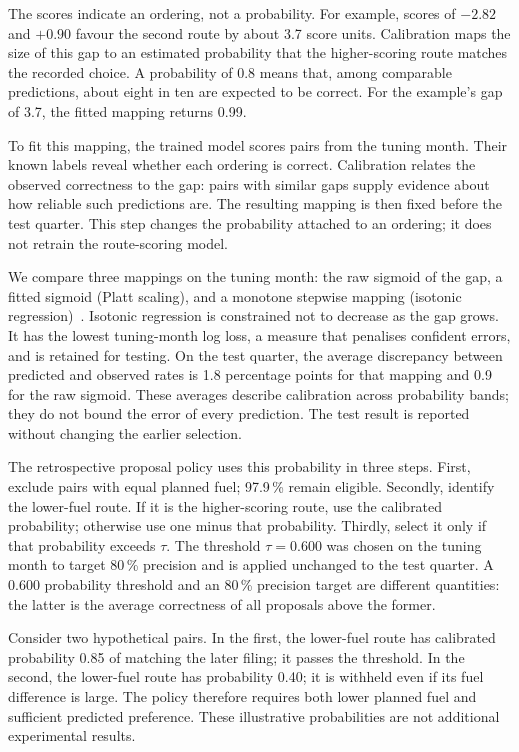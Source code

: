 \documentclass[a4paper,conference]{IEEEtran}
\begin{document}
The scores indicate an ordering, not a probability. For example, scores
of $-2.82$ and $+0.90$ favour the second route by about 3.7 score units.
Calibration maps the size of this gap to an estimated probability that
the higher-scoring route matches the recorded choice. A probability of
0.8 means that, among comparable predictions, about eight in ten are
expected to be correct. For the example's gap of 3.7, the fitted mapping
returns 0.99.

To fit this mapping, the trained model scores pairs from the tuning
month. Their known labels reveal whether each ordering is correct.
Calibration relates the observed correctness to the gap: pairs with
similar gaps supply evidence about how reliable such predictions are.
The resulting mapping is then fixed before the test quarter. This step
changes the probability attached to an ordering; it does not retrain
the route-scoring model.

We compare three mappings on the tuning month: the raw sigmoid of the
gap, a fitted sigmoid (Platt scaling), and a monotone stepwise mapping
(isotonic regression)~\cite{zadrozny2002,guo2017}. Isotonic regression
is constrained not to decrease as the gap grows. It has the lowest
tuning-month log loss, a measure that penalises confident errors, and
is retained for testing.
On the test quarter, the average discrepancy between predicted and
observed rates is 1.8 percentage points for that mapping and 0.9 for
the raw sigmoid. These averages describe calibration across probability
bands; they do not bound the error of every prediction. The test result
is reported without changing the earlier selection.

The retrospective proposal policy uses this probability in three steps.
First, exclude pairs with equal planned fuel; 97.9\,\% remain eligible.
Secondly, identify the lower-fuel route. If it is the higher-scoring
route, use the calibrated probability; otherwise use one minus that probability.
Thirdly, select it only if that probability exceeds $\tau$. The threshold
$\tau=0.600$ was chosen on the tuning month to target 80\,\% precision
and is applied unchanged to the test quarter. A 0.600 probability
threshold and an 80\,\% precision target are different quantities:
the latter is the average correctness of all proposals above the former.

Consider two hypothetical pairs. In the first, the lower-fuel route
has calibrated probability 0.85 of matching the later filing; it passes
the threshold. In the second, the lower-fuel route has probability 0.40;
it is withheld even if its fuel difference is large. The policy therefore
requires both lower planned fuel and sufficient predicted preference.
These illustrative probabilities are not additional experimental results.
\end{document}
